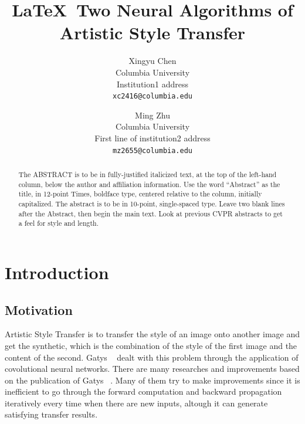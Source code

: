 \documentclass[10pt,twocolumn,letterpaper]{article}
\begin{document}
\title{\LaTeX\ Two Neural Algorithms 
of Artistic Style Transfer}

\author{Xingyu Chen\\
Columbia University\\
Institution1 address\\
{\tt\small xc2416@columbia.edu}
\and
Ming Zhu\\
Columbia University\\
First line of institution2 address\\
{\tt\small mz2655@columbia.edu}
}

\maketitle

\begin{abstract}
   The ABSTRACT is to be in fully-justified italicized text, at the top
   of the left-hand column, below the author and affiliation
   information. Use the word ``Abstract'' as the title, in 12-point
   Times, boldface type, centered relative to the column, initially
   capitalized. The abstract is to be in 10-point, single-spaced type.
   Leave two blank lines after the Abstract, then begin the main text.
   Look at previous CVPR abstracts to get a feel for style and length.
\end{abstract}

\section{Introduction}

\subsection{Motivation}
Artistic Style Transfer is to transfer the style of an image onto another image and get the synthetic, which is the combination of the style of the first image and the content of the second. Gatys \etal~\cite{Authors01} dealt with this problem through the application of covolutional neural networks. There are many researches and improvements based on the publication of Gatys \etal~\cite{Authors01}. Many of them try to make improvements since it is inefficient to go through the forward computation and backward propagation iteratively every time when there are new inputs, altough it can generate satisfying transfer results. 
\end{document}

